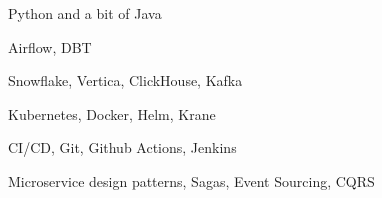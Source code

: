 \item Python and a bit of Java
\item Airflow, DBT
\item Snowflake, Vertica, ClickHouse, Kafka
\item Kubernetes, Docker, Helm, Krane
\item CI/CD, Git, Github Actions, Jenkins
\item Microservice design patterns, Sagas, Event Sourcing, CQRS
